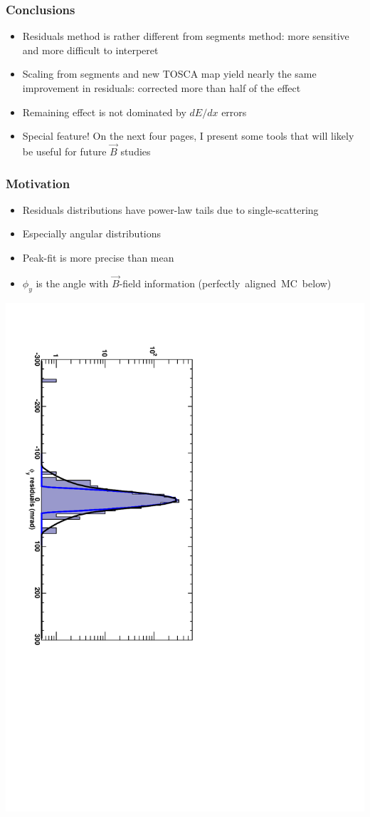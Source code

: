 \documentclass[compress]{beamer}
\begin{document}
\begin{frame}
\frametitle{Conclusions}
\begin{itemize}
\item Residuals method is rather different from segments method: more
  sensitive and more difficult to interperet
\item Scaling from segments and new TOSCA map yield nearly the same
  improvement in residuals: corrected more than half of the effect
\item Remaining effect is not dominated by $dE/dx$ errors
\end{itemize}

\vfill
\begin{itemize}
\item Special feature!  On the next four pages, I present some tools
  that will likely be useful for future $\vec{B}$ studies
\end{itemize}
\label{numpages}
\end{frame}

\begin{frame}
\frametitle{Motivation}
\begin{itemize}
\item Residuals distributions have power-law tails due to single-scattering
\item Especially angular distributions
\item Peak-fit is more precise than mean
\item $\phi_y$ is the angle with $\vec{B}$-field information \mbox{(perfectly aligned MC below)\hspace{-1 cm}}
\end{itemize}
\includegraphics[height=\linewidth, angle=90]{phiy_with_tails.pdf}
\end{frame}
\end{document}
